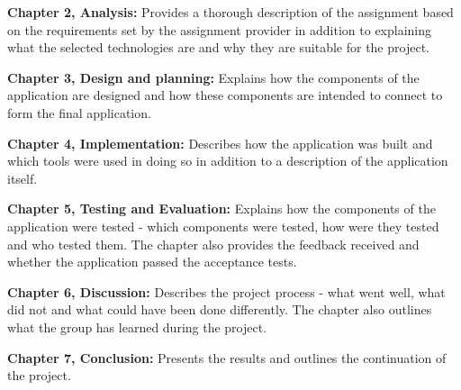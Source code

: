 \textbf{Chapter 2, Analysis:}
Provides a thorough description of the assignment based on the requirements set by the assignment provider in addition to explaining what the selected technologies are and why they are suitable for the project.

\textbf{Chapter 3, Design and planning:}
Explains how the components of the application are designed and how these components are intended to connect to form the final application.

\textbf{Chapter 4, Implementation:}
Describes how the application was built and which tools were used in doing so in addition to a description of the application itself.

\textbf{Chapter 5, Testing and Evaluation:}
Explains how the components of the application were tested - which components were tested, how were they tested and who tested them.
The chapter also provides the feedback received and whether the application passed the acceptance tests.

\textbf{Chapter 6, Discussion:}
Describes the project process - what went well, what did not and what could have been done differently.
The chapter also outlines what the group has learned during the project.

\textbf{Chapter 7, Conclusion:}
Presents the results and outlines the continuation of the project.
